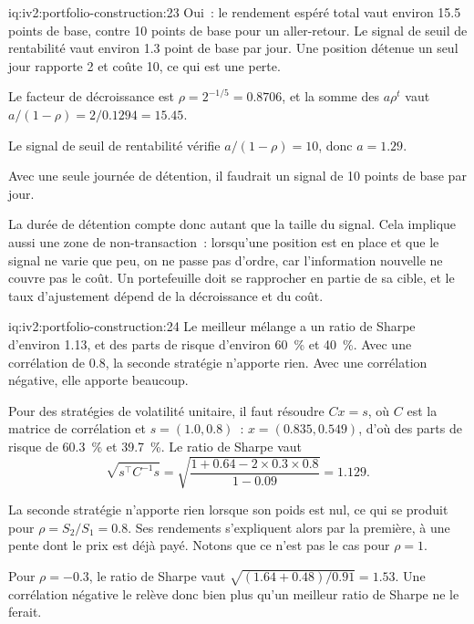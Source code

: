 \begin{solution}{iq:iv2:portfolio-construction:23}
Oui~: le rendement espéré total vaut environ 15.5 points de base, contre 10 points de base pour un aller-retour. Le signal de seuil de rentabilité vaut environ 1.3 point de base par jour. Une position détenue un seul jour rapporte 2 et coûte 10, ce qui est une perte.

Le facteur de décroissance est $\rho = 2^{-1/5} = 0.8706$, et la somme des $a\rho^t$ vaut $a/(1 - \rho) = 2/0.1294 = 15.45$.

Le signal de seuil de rentabilité vérifie $a/(1 - \rho) = 10$, donc $a = 1.29$.

Avec une seule journée de détention, il faudrait un signal de 10 points de base par jour.

La durée de détention compte donc autant que la taille du signal. Cela implique aussi une zone de non-transaction~: lorsqu'une position est en place et que le signal ne varie que peu, on ne passe pas d'ordre, car l'information nouvelle ne couvre pas le coût. Un portefeuille doit se rapprocher en partie de sa cible, et le taux d'ajustement dépend de la décroissance et du coût.

\end{solution}

\begin{solution}{iq:iv2:portfolio-construction:24}
Le meilleur mélange a un ratio de Sharpe d'environ 1.13, et des parts de risque d'environ 60~\% et 40~\%. Avec une corrélation de 0.8, la seconde stratégie n'apporte rien. Avec une corrélation négative, elle apporte beaucoup.

Pour des stratégies de volatilité unitaire, il faut résoudre $Cx = s$, où $C$ est la matrice de corrélation et $s = (1.0, 0.8)$~: $x = (0.835, 0.549)$, d'où des parts de risque de 60.3~\% et 39.7~\%. Le ratio de Sharpe vaut
\[
\sqrt{s^\top C^{-1}s} = \sqrt{\frac{1 + 0.64 - 2 \times 0.3 \times 0.8}{1 - 0.09}} = 1.129.
\]

La seconde stratégie n'apporte rien lorsque son poids est nul, ce qui se produit pour $\rho = S_2/S_1 = 0.8$. Ses rendements s'expliquent alors par la première, à une pente dont le prix est déjà payé. Notons que ce n'est pas le cas pour $\rho = 1$.

Pour $\rho = -0.3$, le ratio de Sharpe vaut $\sqrt{(1.64 + 0.48)/0.91} = 1.53$. Une corrélation négative le relève donc bien plus qu'un meilleur ratio de Sharpe ne le ferait.

\end{solution}

